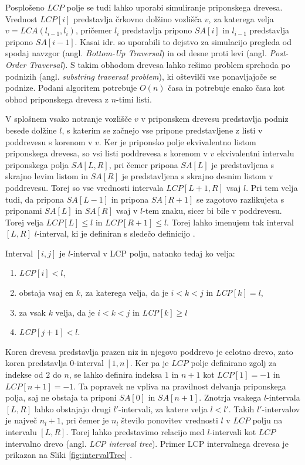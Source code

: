 Posplošeno $LCP$ polje se tudi lahko uporabi simuliranje priponskega drevesa. Vrednost $LCP[i]$ predstavlja črkovno dolžino vozlišča $v$, za katerega velja $v=LCA(l_{i-1},l_i)$, pričemer $l_i$ predstavlja pripono $SA[i]$ in $l_{i-1}$ predstavlja pripono $SA[i-1]$. Kasai idr. \cite{Kasai2001} so uporabili to dejstvo za simulacijo pregleda od spodaj navzgor (angl. \textit{Bottom-Up Traversal}) in od desne proti levi (angl. \textit{Post-Order Traversal}). S takim obhodom drevesa lahko rešimo problem sprehoda po podnizih (angl. \textit{substring traversal problem}), ki oštevilči vse ponavljajoče se podnize. Podani algoritem potrebuje $O(n)$ časa in potrebuje enako časa kot obhod priponskega drevesa z $n$-timi listi.

V splošnem vsako notranje vozlišče $v$ v priponskem drevesu predstavlja podniz besede dolžine $l$, s katerim se začnejo vse pripone predstavljene z listi v poddrevesu s korenom v $v$. Ker je priponsko polje ekvivalentno listom priponskega drevesa, so vsi listi poddrevesa s korenom v $v$ ekvivalentni intervalu priponskega polja $SA[L,R]$, pri čemer pripona $SA[L]$ je predstavljena s skrajno levim listom in $SA[R]$ je predstavljena s skrajno desnim listom v poddrevesu. Torej so vse vrednosti intervala $LCP[L+1,R]$ vsaj $l$. Pri tem velja tudi, da pripona $SA[L-1]$ in pripona $SA[R+1]$ se zagotovo razlikujeta s priponami $SA[L]$ in $SA[R]$ vsaj v $l$-tem znaku, sicer bi bile v poddrevesu. Torej velja $LCP[L]\le l$ in $LCP[R+1]\le l$. Torej lahko imenujem tak interval $[L,R]$ $l$-interval, ki je definiran s sledečo definicijo \cite{Abouelhoda2004}.
\begin{defi}
    Interval $[i,j]$ je $l$-interval v LCP polju, natanko tedaj ko velja:
    \begin{enumerate}
        \item \textit{LCP}$[i]<l$,
        \item obstaja vsaj en $k$, za katerega velja, da je $i< k< j$ in \textit{LCP}$[k]=l$,
        \item za vsak $k$ velja, da je $i< k< j$ in \textit{LCP}$[k]\ge l$
        \item \textit{LCP}$[j+1]<l$.      
    \end{enumerate}
\end{defi}

Koren drevesa predstavlja prazen niz in njegovo poddrevo je celotno drevo, zato koren predstavlja $0$-interval $[1,n]$. Ker pa je $LCP$ polje definirano zgolj za indekse od $2$ do $n$, se lahko definira indeksa $1$ in $n+1$ kot $LCP[1]=-1$ in $LCP[n+1]=-1$. Ta popravek ne vpliva na pravilnost delvanja priponskega polja, saj ne obstaja ta priponi $SA[0]$ in $SA[n+1]$. Znotrja vsakega $l$-intervala $[L,R]$ lahko obstajajo drugi $l'$-intervali, za katere velja $l<l'$. Takih $l'$-intervalov je največ $n_l+1$, pri čemer je $n_l$ število ponovitev vrednosti $l$ v $LCP$ polju na intervalu $[L,R]$. Torej lahko predstavimo relacijo med $l$-intervali kot $LCP$ intervalno drevo (angl. \textit{LCP interval tree}). Primer LCP intervalnega drevesa je prikazan na Sliki \ref{fig:intervalTree} \cite{Abouelhoda2004}.

